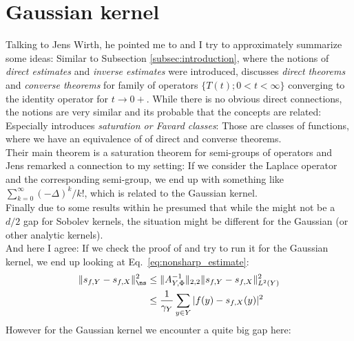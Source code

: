 \documentclass[a4paper, 10pt]{article}
\begin{document}
\section{Gaussian kernel}

Talking to Jens Wirth, he pointed me to \cite[Chapter 2.1]{butzer2013semi} and I try to approximately summarize some ideas:
Similar to Subsection \ref{subsec:introduction}, where the notions of \textit{direct estimates} and \textit{inverse estimates} were introduced,
\cite{butzer2013semi} discusses \textit{direct theorems} and \textit{converse theorems} for family of operators $\{ T(t); 0 < t < \infty \}$ converging to the identity operator for $t \rightarrow 0+$.
While there is no obvious direct connections, the notions are very similar and its probable that the concepts are related:
Especially \cite[Definition 2.1.1]{butzer2013semi} introduces \textit{saturation or Favard classes}:
Those are classes of functions, where we have an equivalence of of direct and converse theorems. \\
Their main theorem is a saturation theorem for semi-groups of operators and Jens remarked a connection to my setting:
If we consider the Laplace operator and the corresponding semi-group, we end up with something like $\sum_{k=0}^\infty (-\Delta)^k / k!$, which is related to the Gaussian kernel. \\
Finally due to some results within \cite{butzer2013semi} he presumed that while the might not be a $d/2$ gap for Sobolev kernels, the situation might be different for the Gaussian (or other analytic kernels). \\
And here I agree: If we check the proof of \cite[Theorem 6.1]{schaback2002inverse} and try to run it for the Gaussian kernel, 
we end up looking at Eq.\ \eqref{eq:nonsharp_estimate}:
\begin{align*}
\Vert s_{f, Y} - s_{f, X} \Vert_{\ns}^2 &\leq \Vert A_{Y, \Phi}^{-1} \Vert_{2,2} \Vert s_{f, Y} - s_{f, X} \Vert_{L^2(Y)}^2 \notag \\
&\leq \frac{1}{\gamma_Y} \sum_{y \in Y} |f(y) - s_{f, X}(y)|^2 \notag
\end{align*}
However for the Gaussian kernel we encounter a quite big gap here:
\end{document}
